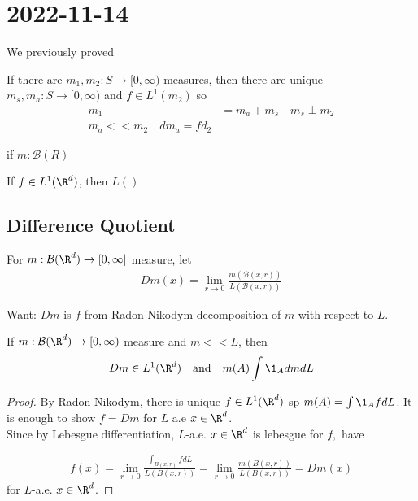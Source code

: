 \section{2022-11-14}

We previously proved 

\begin{theorem}
	If there are $m_1, m_2 : S \to [0, \infty)$ measures, then there are unique $m_s, m_a : S \to [0, \infty)$ and $f \in L^{1} (m_2)$ so
	\begin{align*}
		m_1 &= m_a + m_s \quad m_s \perp m_2 \\
		m_a << m_2 \quad d m_a = f d_2
	\end{align*} 

\end{theorem}


\begin{theorem}
		if $m : \mathcal{B}(R)$
\end{theorem}

\begin{theorem}
	If $f \in L^{1} (\R^d)$, then $L ()$
\end{theorem}

\subsection{Difference Quotient}

\begin{definition}
	For $m: \mathcal{B}(\R^d) \to [0, \infty]$ measure,
	let 
	\begin{align*}
		D m (x) = \lim_{r \to 0} \frac{m ( \mathcal{B} (x, r))}{L(\mathcal{B}(x, r))}
	\end{align*} 

	Want: $D m$ is $f$ from Radon-Nikodym decomposition of $m$ with respect to $L$.
\end{definition}

\begin{theorem}
	If $m: \mathcal{B}(\R^d) \to [0, \infty)$ measure and $m << L$, then 
	\begin{align*}
		D m \in L^{1} (\R^d) \quad \text{and} \quad m(A) \int \1_A dm dL
	\end{align*} 
\end{theorem}

\begin{proof}
	By Radon-Nikodym, there is unique $f \in L^1(\R^d)$ sp $m(A) = \int \1_A f dL$.
	It is enough to show  $f = D m$ for $L$ a.e $x \in \R^d$. \\

	Since  by Lebesgue differentiation, $L$-a.e. $x \in \R^d$ is lebesgue for $f,$ have

	\begin{align*}
		f(x) = \lim_{r \to 0} \frac{\int_{B(x, r)} f dL}{L(B(x,r))} = \lim_{r \to 0} \frac{m(B(x,r))}{L(B(x,r))} = D m(x)
	\end{align*} 
	for $L$-a.e. $x \in \R^d$.
\end{proof}

